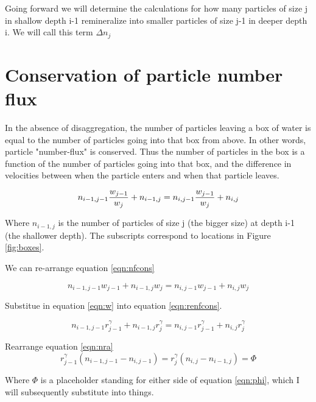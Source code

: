 \documentclass[a4paper,12pt]{article}
\begin{document}
Going forward we will determine the calculations for how many particles of size j in shallow depth i-1 remineralize into smaller particles of size j-1 in deeper depth i. We will call this term $\Delta n_j$

\section{Conservation of particle number flux}

In the absence of disaggregation, the number of particles leaving a box of water is equal to the number of particles going into that box from above. In other words, particle "number-flux" is conserved. Thus the number of particles in the box is a function of the number of particles going into that box, and the difference in velocities between when the particle enters and when that particle leaves.

\begin{equation}
n_{i-1, j-1}  {{w_{j-1}}\over{w_j}} + n_{i-1,j} = n_{i,j-1} {{w_{j-1}}\over{w_j}} + n_{i,j}
\label{eqn:nfcons}
\end{equation}

Where $n_{i-1,j}$ is the number of particles of size j (the bigger size) at depth i-1 (the shallower depth). The subscripts correspond to locations in Figure \ref{fig:boxes}.

We can re-arrange equation \ref{eqn:nfcons}

\begin{equation}
n_{i-1, j-1} w_{j-1} + n_{i-1,j} w_j = n_{i,j-1} w_{j-1} + n_{i,j} w_j
\label{eqn:renfcons}
\end{equation}


Substitue in equation \ref{eqn:w} into equation \ref{eqn:renfcons}.

\begin{equation}
n_{i-1, j-1} r^\gamma_{j-1} + n_{i-1,j} r^\gamma_j = n_{i,j-1} r^\gamma_{j-1} + n_{i,j} r^\gamma_j
\label{eqn:nra}
\end{equation}

Rearrange equation \ref{eqn:nra}
\begin{equation}
r^\gamma_{j-1} (n_{i-1, j-1} - n_{i, j-1} ) = r^\gamma_{j} (n_{i, j} - n_{i-1, j} ) = \Phi
\label{eqn:phi}
\end{equation}

Where $\Phi$ is a placeholder standing for either side of equation \ref{eqn:phi}, which I will subsequently substitute into things.

\medskip
\end{document}

